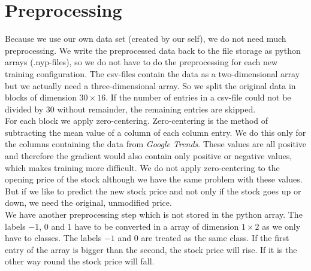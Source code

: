 \section{Preprocessing}
\label{sec:preprocessing}
Because we use our own data set (created by our self), we do not need much preprocessing. We write the preprocessed data back to the file storage as python arrays (.nyp-files), so we do not have to do the preprocessing for each new training configuration. The csv-files contain the data as a two-dimensional array but we actually need a three-dimensional array. So we split the original data in blocks of dimension $30 \times 16$. If the number of entries in a csv-file could not be divided by 30 without remainder, the remaining entries are skipped.\\
For each block we apply zero-centering. Zero-centering is the method of subtracting the mean value of a column of each column entry. We do this only for the columns containing the data from \textit{Google Trends}. These values are all positive and therefore the gradient would also contain only positive or negative values, which makes training more difficult. We do not apply zero-centering to the opening price of the stock although we have the same problem with these values. But if we like to predict the new stock price and not only if the stock goes up or down, we need the original, unmodified price.\\
We have another preprocessing step which is not stored in the python array. The labels $-1$, $0$ and $1$ have to be converted in a array of dimension $1 \times 2$ as we only have to classes. The labels $-1$ and $0$ are treated as the same class. If the first entry of the array is bigger than the second, the stock price will rise. If it is the other way round the stock price will fall.